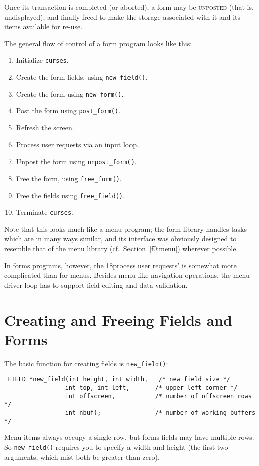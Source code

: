 Once its transaction is completed (or aborted), a form may be
\textsc{unposted} (that is, undisplayed), and finally freed to make
the storage associated with it and its items available for re-use. 

The general flow of control of a form program looks like this:
\begin{enumerate}
\item Initialize \texttt{curses}.
\item Create the form fields, using \texttt{new\_field()}.
\item Create the form using \texttt{new\_form()}.
\item Post the form using \texttt{post\_form()}.
\item Refresh the screen.
\item Process user requests via an input loop.
\item Unpost the form using \texttt{unpost\_form()}.
\item Free the form, using \texttt{free\_form()}.
\item Free the fields using \texttt{free\_field()}.
\item Terminate \texttt{curses}.
\end{enumerate}
Note that this looks much like a menu program; the form library handles
tasks which are in many ways similar, and its interface was obviously
designed to resemble that of the menu library (cf.\ Section~\ref{f0:menu})
wherever possible. 

In forms programs, however, the \char18process user requests' is somewhat more
complicated than for menus.  Besides menu-like navigation operations,
the menu driver loop has to support field editing and data validation.

\section{Creating and Freeing Fields and Forms}

\label{f0:fcreate}The basic function for creating fields is \texttt{new\_field()}:
\begin{verbatim} FIELD *new_field(int height, int width,   /* new field size */
                 int top, int left,       /* upper left corner */
                 int offscreen,           /* number of offscreen rows */
                 int nbuf);               /* number of working buffers */
\end{verbatim}
Menu items always occupy a single row, but forms fields may have
multiple rows.  So \texttt{new\_field()} requires you to specify a
width and height (the first two arguments, which mist both be greater
than zero). 

